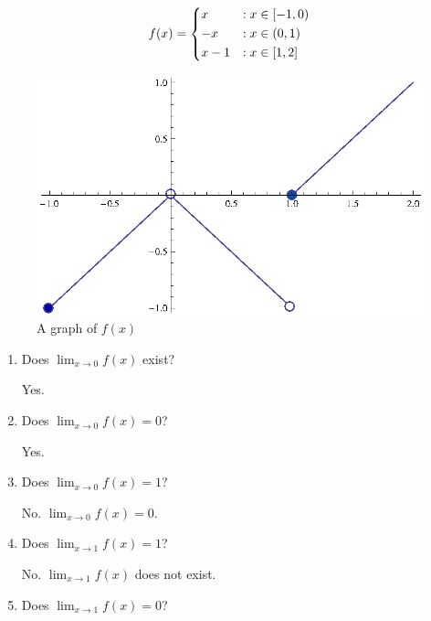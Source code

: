 \begin{ex}
  \[ f(x)=
    \begin{dcases}
      x &: x \in \left[ -1,0 \right) \\
      -x &: x \in \left (0,1 \right) \\
      x-1 &: x \in \left[1, 2\right]
    \end{dcases}
    \]
  \begin{figure}[h]
    \begin{center}
      \includegraphics{graphs/pwlimex1.eps}
    \end{center}
    \caption{A graph of \(f(x)\)}
    \label{fig:pwlimex1}
  \end{figure}
  \begin{enumerate}
    \item Does \( \lim_{x\to 0} f(x) \) exist?

      \begin{sol}
        Yes.
      \end{sol}
    \item Does \( \lim_{x \to 0} f(x)=0 \)?

      \begin{sol}
        Yes.
      \end{sol}
    \item Does \(\lim_{x \to 0} f(x)=1\)?

      \begin{sol}
        No. \(\lim_{x \to 0} f(x)=0\).
      \end{sol}
    \item Does \(\lim_{x \to 1} f(x)=1\)?

      \begin{sol}
        No. \( \lim_{x \to 1} f(x) \) does not exist.
      \end{sol}
    \item Does \(\lim_{x \to 1} f(x)=0\)?


\end{enumerate}
\end{ex}

